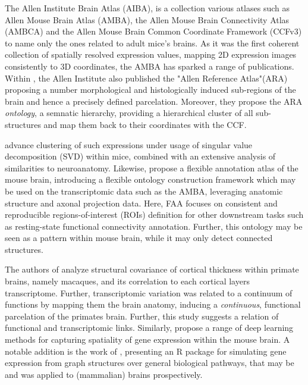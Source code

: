 \documentclass[]{article}
\renewcommand{\cite}{\citep}
\begin{document}
The Allen Institute Brain Atlas (AIBA), is a collection various atlases such as Allen Mouse Brain Atlas (AMBA)\cite{MouseBrainAtlas, daigle2018suite}, the Allen Mouse Brain Connectivity Atlas (AMBCA) \cite{oh2014mesoscale, harris2019hierarchical} and the Allen Mouse Brain Common Coordinate Framework (CCFv3) \cite{wang2020allen} to name only the ones related to adult mice's brains. As it was the first coherent collection of spatially resolved expression values, mapping 2D expression images consistently to 3D coordinates, the AMBA has sparked a range of publications. Within \citet{MouseBrainAtlas}, the Allen Institute also published the "Allen Reference Atlas"(ARA) proposing a number morphological and histologically induced sub-regions of the brain and hence a precisely defined parcelation. Moreover, they propose the ARA \textit{ontology}, a semnatic hierarchy, providing a hierarchical cluster of all sub-structures and map them back to their coordinates with the CCF. 


\citet{bohland2010clustering} advance clustering of such expressions under usage of singular value decomposition (SVD) within mice, combined with an extensive analysis of similarities to neuroanatomy.
Likewise, \citet{takata_flexible_2021} propose a flexible annotation atlas of the mouse brain, introducing a flexible ontology construction framework which may be used on the transcriptomic data such as the AMBA, leveraging anatomic structure and axonal projection data. Here, FAA focuses on consistent and reproducible regions-of-interest (ROIs) definition for other downstream tasks such as resting-state functional connectivity annotation. Further, this ontology may be seen as a pattern within mouse brain, while it may only detect connected structures. 

The authors of \citet{ValkShapingBrainStructure2020} analyze structural covariance of cortical thickness within primate brains, namely macaques, and its correlation to each cortical layers transcriptome. Further, transcriptomic variation was related to a continuum of functions by mapping them the brain anatomy, inducing a \textit{continuous}, functional parcelation of the primates brain. Further, this study suggests a relation of functional and transcriptomic links. Similarly, \citet{zeng_deep_2015} propose a range of deep learning methods for capturing spatiality of gene expression within the mouse brain. A notable addition is the work of \citet{kelly_graphsim_2020}, presenting an R package for simulating gene expression from graph structures over general biological pathways, that may be and was applied to (mammalian) brains prospectively. 
\end{document}
